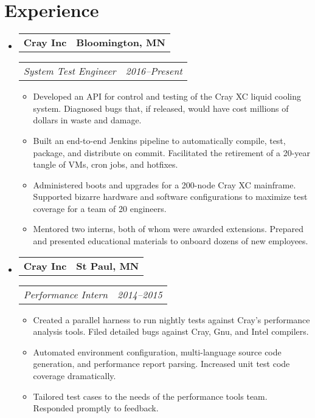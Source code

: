 \documentclass[11pt,letterpaper]{article}
\makeatletter
\newcommand{\headerrow}[2]{
    \begin{tabular*}{\linewidth}{l@{ \extracolsep{\fill} }r} #1 & #2
    \end{tabular*}
}
\newcommand{\YearRange}[2]{#1--#2}
\newcommand{\ResumeSection}[1]{
    \section*{ {\color{MidnightBlue}#1 \sout{\hfill} } }
}
\makeatother
\begin{document}
\ResumeSection{Experience}

\begin{itemize}[leftmargin=\parindent]
    \parskip=0.1em
    \itemsep=1.5em

    \item[]
        \headerrow{ \textbf{Cray Inc} }{ \textbf{Bloomington, MN} }
        \headerrow
            { \emph{System Test Engineer} }
            { \emph{ \YearRange{2016}{Present} } }
        \begin{itemize}
            \item Developed an API for control and testing of the Cray XC liquid cooling system. Diagnosed bugs that, if released, would have cost millions of dollars in waste and damage.
            \item Built an end-to-end Jenkins pipeline to automatically compile, test, package, and distribute on commit. Facilitated the retirement of a 20-year tangle of VMs, cron jobs, and hotfixes.
            \item Administered boots and upgrades for a 200-node Cray XC mainframe. Supported bizarre hardware and software configurations to maximize test coverage for a team of 20 engineers.
            \item Mentored two interns, both of whom were awarded extensions. Prepared and presented educational materials to onboard dozens of new employees.
        \end{itemize}

    \item[]
        \headerrow{ \textbf{Cray Inc} }{ \textbf{St Paul, MN} }
        \headerrow
            { \emph{Performance Intern} }
            { \emph{ \YearRange{2014}{2015} } }
        \begin{itemize}
            \item Created a parallel harness to run nightly tests against Cray's performance analysis tools. Filed detailed bugs against Cray, Gnu, and Intel compilers.
            \item Automated environment configuration, multi-language source code generation, and performance report parsing. Increased unit test code coverage dramatically.
            \item Tailored test cases to the needs of the performance tools team. Responded promptly to feedback.
        \end{itemize}


\end{itemize}
\end{document}
